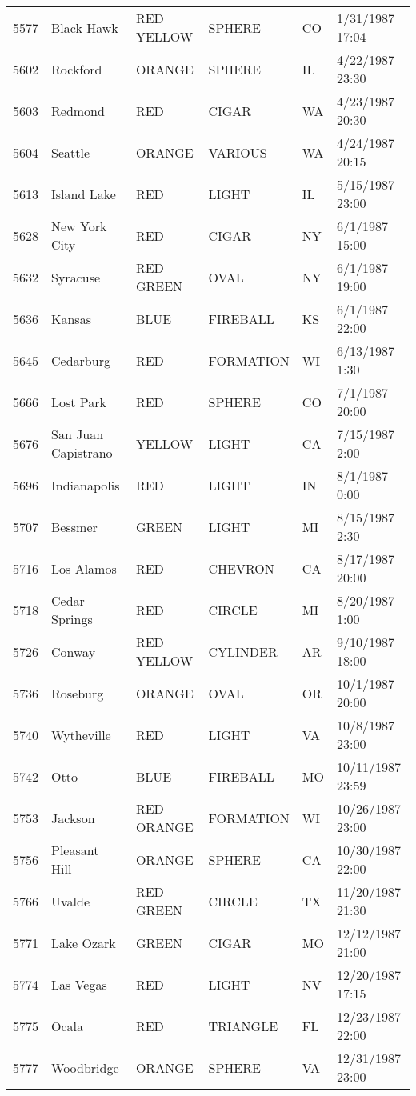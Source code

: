 \begin{tabular}{llllll}
5577 & Black Hawk & RED YELLOW & SPHERE & CO & 1/31/1987 17:04 \\
5602 & Rockford & ORANGE & SPHERE & IL & 4/22/1987 23:30 \\
5603 & Redmond & RED & CIGAR & WA & 4/23/1987 20:30 \\
5604 & Seattle & ORANGE & VARIOUS & WA & 4/24/1987 20:15 \\
5613 & Island Lake & RED & LIGHT & IL & 5/15/1987 23:00 \\
5628 & New York City & RED & CIGAR & NY & 6/1/1987 15:00 \\
5632 & Syracuse & RED GREEN & OVAL & NY & 6/1/1987 19:00 \\
5636 & Kansas & BLUE & FIREBALL & KS & 6/1/1987 22:00 \\
5645 & Cedarburg & RED & FORMATION & WI & 6/13/1987 1:30 \\
5666 & Lost Park & RED & SPHERE & CO & 7/1/1987 20:00 \\
5676 & San Juan Capistrano & YELLOW & LIGHT & CA & 7/15/1987 2:00 \\
5696 & Indianapolis & RED & LIGHT & IN & 8/1/1987 0:00 \\
5707 & Bessmer & GREEN & LIGHT & MI & 8/15/1987 2:30 \\
5716 & Los Alamos & RED & CHEVRON & CA & 8/17/1987 20:00 \\
5718 & Cedar Springs & RED & CIRCLE & MI & 8/20/1987 1:00 \\
5726 & Conway & RED YELLOW & CYLINDER & AR & 9/10/1987 18:00 \\
5736 & Roseburg & ORANGE & OVAL & OR & 10/1/1987 20:00 \\
5740 & Wytheville & RED & LIGHT & VA & 10/8/1987 23:00 \\
5742 & Otto & BLUE & FIREBALL & MO & 10/11/1987 23:59 \\
5753 & Jackson & RED ORANGE & FORMATION & WI & 10/26/1987 23:00 \\
5756 & Pleasant Hill & ORANGE & SPHERE & CA & 10/30/1987 22:00 \\
5766 & Uvalde & RED GREEN & CIRCLE & TX & 11/20/1987 21:30 \\
5771 & Lake Ozark & GREEN & CIGAR & MO & 12/12/1987 21:00 \\
5774 & Las Vegas & RED & LIGHT & NV & 12/20/1987 17:15 \\
5775 & Ocala & RED & TRIANGLE & FL & 12/23/1987 22:00 \\
5777 & Woodbridge & ORANGE & SPHERE & VA & 12/31/1987 23:00 \\

\end{tabular}
